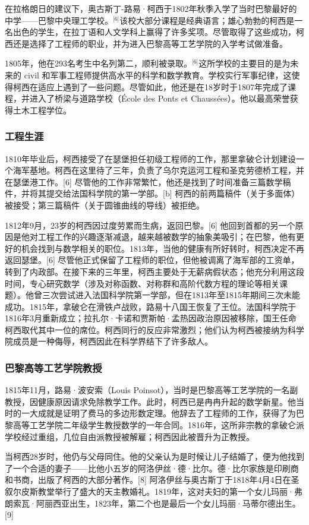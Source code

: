 在拉格朗日的建议下，奥古斯丁-路易·柯西于1802年秋季入学了当时巴黎最好的中学——巴黎中央理工学校。\(^\text{[6]}\)该校大部分课程是经典语言；雄心勃勃的柯西是一名出色的学生，在拉丁语和人文学科上赢得了许多奖项。尽管取得了这些成功，柯西还是选择了工程师的职业，并为进入巴黎高等工艺学院的入学考试做准备。

1805年，他在293名考生中名列第二，顺利被录取。\(^\text{[6]}\)这所学校的主要目的是为未来的 civil 和军事工程师提供高水平的科学和数学教育。学校实行军事纪律，这使得柯西在适应上遇到了一些问题。尽管如此，他还是在18岁时于1807年完成了课程，并进入了桥梁与道路学校（École des Ponts et Chaussées）。他以最高荣誉获得土木工程学位。
\subsubsection{工程生涯}  
1810年毕业后，柯西接受了在瑟堡担任初级工程师的工作，那里拿破仑计划建设一个海军基地。柯西在这里待了三年，负责了乌尔克运河工程和圣克劳德桥工程，并在瑟堡港工作。[6] 尽管他的工作非常繁忙，他还是找到了时间准备三篇数学稿件，并将其提交给法国科学院的第一学部。[b] 柯西的前两篇稿件（关于多面体）被接受；第三篇稿件（关于圆锥曲线的导线）被拒绝。

1812年9月，23岁的柯西因过度劳累而生病，返回巴黎。[6] 他回到首都的另一个原因是他对工程工作的兴趣逐渐减退，越来越被数学的抽象美吸引；在巴黎，他有更好的机会找到与数学相关的职位。1813年，当他的健康有所好转时，柯西决定不再返回瑟堡。[6] 尽管他正式保留了工程师的职位，但他被调离了海军部的工资单，转到了内政部。在接下来的三年里，柯西主要处于无薪病假状态；他充分利用这段时间，专心研究数学（涉及对称函数、对称群和高阶代数方程的理论等相关课题）。他曾三次尝试进入法国科学院第一学部，但在1813年至1815年期间三次未能成功。1815年，拿破仑在滑铁卢战败，路易十八国王恢复了王位。法国科学院于1816年3月重新成立；拉扎尔·卡诺和贾斯帕·孟热因政治原因被移除，国王任命柯西取代其中一位的席位。柯西同行的反应非常激烈；他们认为柯西被接纳为科学院成员是一种侮辱，柯西因此在科学界结下了许多敌人。
\subsubsection{巴黎高等工艺学院教授}  
1815年11月，路易·波安索（Louis Poinsot），当时是巴黎高等工艺学院的一名副教授，因健康原因请求免除教学工作。此时，柯西已是冉冉升起的数学新星。他当时的一大成就是证明了费马的多边形数定理。他辞去了工程师的工作，获得了为巴黎高等工艺学院二年级学生教授数学的一年合同。1816年，这所非宗教的拿破仑派学校经过重组，几位自由派教授被解雇；柯西因此被晋升为正教授。

当柯西28岁时，他仍与父母同住。他的父亲认为是时候让儿子结婚了，便为他找到了一个合适的妻子——比他小五岁的阿洛伊丝·德·比尔。德·比尔家族是印刷商和书商，出版了柯西的大部分著作。[8] 阿洛伊丝与奥古斯丁于1818年4月4日在圣叙尔皮斯教堂举行了盛大的天主教婚礼。1819年，这对夫妇的第一个女儿玛丽·弗朗索瓦·阿丽西亚出生，1823年，第二个也是最后一个女儿玛丽·马蒂尔德出生。[9]

